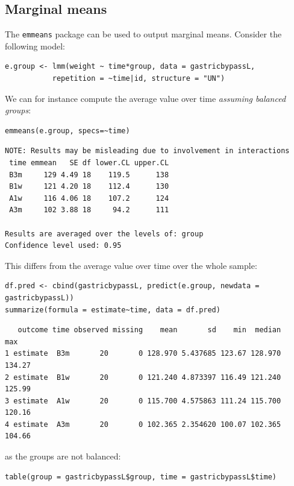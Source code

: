 \documentclass[12pt]{article}
\begin{document}
\subsection{Marginal means}
\label{sec:orgacc7e39}

The \texttt{emmeans} package can be used to output marginal means. Consider
the following model:
\lstset{language=r,label= ,caption= ,captionpos=b,numbers=none}
\begin{lstlisting}
e.group <- lmm(weight ~ time*group, data = gastricbypassL,
	       repetition = ~time|id, structure = "UN")
\end{lstlisting}

We can for instance compute the average value over time \emph{assuming balanced groups}:
\lstset{language=r,label= ,caption= ,captionpos=b,numbers=none}
\begin{lstlisting}
emmeans(e.group, specs=~time)
\end{lstlisting}

\begin{verbatim}
NOTE: Results may be misleading due to involvement in interactions
 time emmean   SE df lower.CL upper.CL
 B3m     129 4.49 18    119.5      138
 B1w     121 4.20 18    112.4      130
 A1w     116 4.06 18    107.2      124
 A3m     102 3.88 18     94.2      111

Results are averaged over the levels of: group 
Confidence level used: 0.95
\end{verbatim}


This differs from the average value over time over the whole sample:
\lstset{language=r,label= ,caption= ,captionpos=b,numbers=none}
\begin{lstlisting}
df.pred <- cbind(gastricbypassL, predict(e.group, newdata = gastricbypassL))
summarize(formula = estimate~time, data = df.pred)
\end{lstlisting}

\begin{verbatim}
   outcome time observed missing    mean       sd    min  median    max
1 estimate  B3m       20       0 128.970 5.437685 123.67 128.970 134.27
2 estimate  B1w       20       0 121.240 4.873397 116.49 121.240 125.99
3 estimate  A1w       20       0 115.700 4.575863 111.24 115.700 120.16
4 estimate  A3m       20       0 102.365 2.354620 100.07 102.365 104.66
\end{verbatim}


as the groups are not balanced:
\lstset{language=r,label= ,caption= ,captionpos=b,numbers=none}
\begin{lstlisting}
table(group = gastricbypassL$group, time = gastricbypassL$time)
\end{lstlisting}
\end{document}
